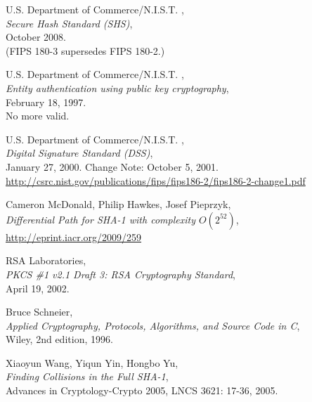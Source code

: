 \newpage
\begin{thebibliography}{99999}

 U.S. Department of Commerce/N.I.S.T. ,
     \\
    {\em Secure Hash Standard (SHS)}, \\
    October 2008.\\
    (FIPS 180-3 supersedes FIPS 180-2.)

 U.S. Department of Commerce/N.I.S.T. ,
     \\
    {\em Entity authentication using public key cryptography}, \\
    February 18, 1997.\\
    No more valid.
    
 U.S. Department of Commerce/N.I.S.T. ,
     \\
    {\em Digital Signature Standard (DSS)}, \\
    January 27, 2000. Change Note: October 5, 2001.\\
   \url{http://csrc.nist.gov/publications/fips/fips186-2/fips186-2-change1.pdf}

 Cameron McDonald, Philip Hawkes, Josef Pieprzyk, 
     \\
    {\em Differential Path for SHA-1 with complexity $O(2^{52})$}, \\
    \url{http://eprint.iacr.org/2009/259}

 RSA Laboratories,
      \\
    {\em PKCS \#1 v2.1 Draft 3: RSA Cryptography Standard}, \\
    April 19, 2002.

  
    Bruce Schneier, \\
    {\em Applied Cryptography, Protocols, Algorithms, and Source Code in C}, \\
    Wiley, 2nd edition, 1996.

 Xiaoyun Wang, Yiqun Yin, Hongbo Yu, 
     \\
    {\em Finding Collisions in the Full SHA-1}, \\
    Advances in Cryptology-Crypto 2005, LNCS 3621: 17-36, 2005.


\end{thebibliography}
